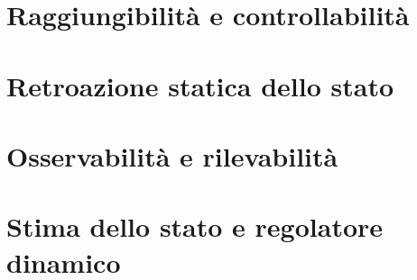 \documentclass[../main.tex]{subfiles}
\begin{document}
\clearpage
\thispagestyle{empty}
\vspace*{7cm}
\section{Raggiungibilità e controllabilità}
\vspace*{1.5cm}


\clearpage
\thispagestyle{empty}
\vspace*{7cm}
\section{Retroazione statica dello stato}
\vspace*{1.5cm}



\clearpage
\thispagestyle{empty}
\vspace*{7cm}
\section{Osservabilità e rilevabilità}
\vspace*{1.5cm}



\clearpage
\thispagestyle{empty}
\vspace*{7cm}
\section{Stima dello stato e regolatore dinamico}
\vspace*{1.5cm}
\end{document}
